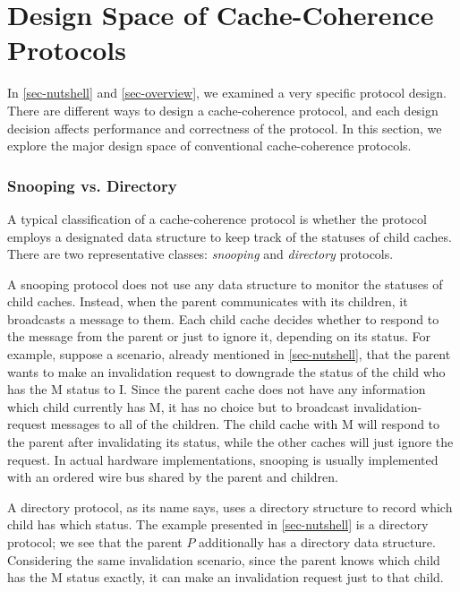 \section{Design Space of Cache-Coherence Protocols}
\label{sec-design-space}

In \autoref{sec-nutshell} and \autoref{sec-overview}, we examined a very specific protocol design.
There are different ways to design a cache-coherence protocol, and each design decision affects performance and correctness of the protocol.
In this section, we explore the major design space of conventional cache-coherence protocols.

\subsubsection{Snooping vs. Directory}

A typical classification of a cache-coherence protocol is whether the protocol employs a designated data structure to keep track of the statuses of child caches.
There are two representative classes: \emph{snooping} and \emph{directory} protocols.

A snooping protocol does not use any data structure to monitor the statuses of child caches.
Instead, when the parent communicates with its children, it broadcasts a message to them.
Each child cache decides whether to respond to the message from the parent or just to ignore it, depending on its status.
For example, suppose a scenario, already mentioned in \autoref{sec-nutshell}, that the parent wants to make an invalidation request to downgrade the status of the child who has the M status to I.
Since the parent cache does not have any information which child currently has M, it has no choice but to broadcast invalidation-request messages to all of the children.
The child cache with M will respond to the parent after invalidating its status, while the other caches will just ignore the request.
In actual hardware implementations, snooping is usually implemented with an ordered wire bus shared by the parent and children.

A directory protocol, as its name says, uses a directory structure to record which child has which status.
The example presented in \autoref{sec-nutshell} is a directory protocol; we see that the parent $P$ additionally has a directory data structure.
Considering the same invalidation scenario, since the parent knows which child has the M status exactly, it can make an invalidation request just to that child.

